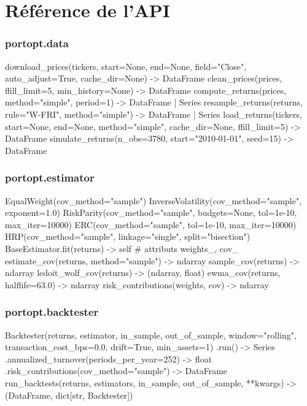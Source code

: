 \documentclass[11pt,a4paper]{article}
\begin{document}
\section{Référence de l'API}\label{sec:api}

\subsubsection*{portopt.data}
\begin{pyout}
download_prices(tickers, start=None, end=None, field="Close", auto_adjust=True,
                cache_dir=None) -> DataFrame
clean_prices(prices, ffill_limit=5, min_history=None) -> DataFrame
compute_returns(prices, method="simple", period=1) -> DataFrame | Series
resample_returns(returns, rule="W-FRI", method="simple") -> DataFrame | Series
load_returns(tickers, start=None, end=None, method="simple", cache_dir=None,
             ffill_limit=5) -> DataFrame
simulate_returns(n_obs=3780, start="2010-01-01", seed=15) -> DataFrame
\end{pyout}

\subsubsection*{portopt.estimator}
\begin{pyout}
EqualWeight(cov_method="sample")
InverseVolatility(cov_method="sample", exponent=1.0)
RiskParity(cov_method="sample", budgets=None, tol=1e-10, max_iter=10000)
ERC(cov_method="sample", tol=1e-10, max_iter=10000)
HRP(cov_method="sample", linkage="single", split="bisection")
BaseEstimator.fit(returns) -> self      # attributs weights_, cov_
estimate_cov(returns, method="sample") -> ndarray
sample_cov(returns) -> ndarray
ledoit_wolf_cov(returns) -> (ndarray, float)
ewma_cov(returns, halflife=63.0) -> ndarray
risk_contributions(weights, cov) -> ndarray
\end{pyout}

\subsubsection*{portopt.backtester}
\begin{pyout}
Backtester(returns, estimator, in_sample, out_of_sample, window="rolling",
           transaction_cost_bps=0.0, drift=True, min_assets=1)
  .run() -> Series
  .annualized_turnover(periods_per_year=252) -> float
  .risk_contributions(cov_method="sample") -> DataFrame
run_backtests(returns, estimators, in_sample, out_of_sample, **kwargs)
  -> (DataFrame, dict[str, Backtester])
\end{pyout}
\end{document}
